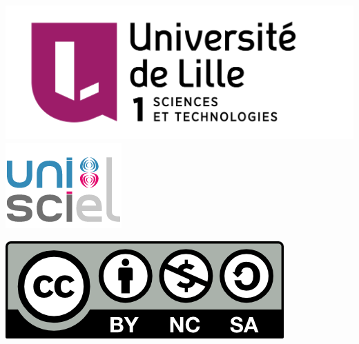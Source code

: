 





\begin{frame}

\thispagestyle{empty}    

  \hspace*{-20ex}
  \begin{minipage}{0.35\textwidth}
  \begin{center}
    \vspace*{5ex}   


    \bigskip

    \includegraphics[scale=0.13]{../divers/Logo-Univ-Lille-1-new.png}
    \quad
    \includegraphics[scale=0.3]{../divers/logo-unisciel.png}

    \vspace*{5ex}

    \includegraphics[scale=0.5]{../divers/by-nc-sa.png}
  \end{center}
  \end{minipage}
  \hfil
  \begin{minipage}{0.90\textwidth}
  \footnotesize
   \vspace*{2ex}


\end{minipage}
\end{frame}
